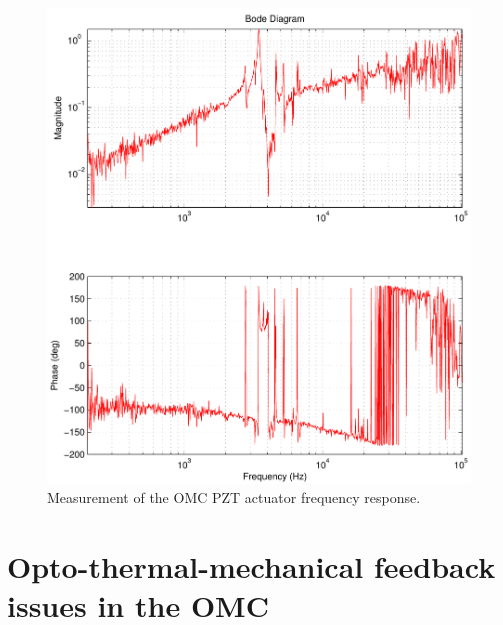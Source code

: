 \begin{figure}
  \begin{center}
  \leavevmode
  \includegraphics{figs-omc/pzttf.pdf}
  \end{center}
  \caption[Measurement of the OMC PZT actuator frequency response.]{Measurement of the OMC PZT actuator frequency response.}
  \label{fig:pzttf}
\end{figure}


\section{Opto-thermal-mechanical feedback issues in the OMC}


